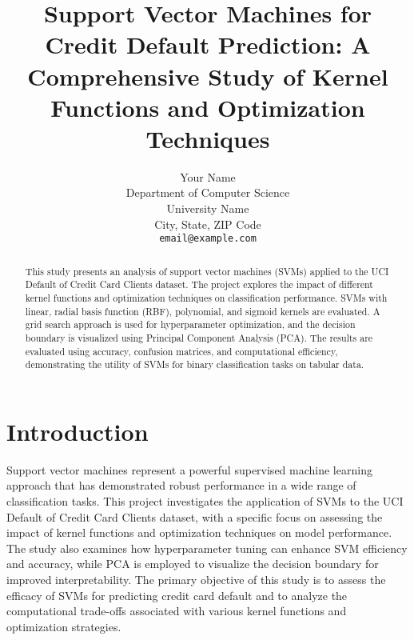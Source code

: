 \documentclass{article}  %
\begin{document}
\title{Support Vector Machines for Credit Default Prediction: A Comprehensive Study of Kernel Functions and Optimization Techniques}

\author{%
  Your Name \\
  Department of Computer Science\\
  University Name\\
  City, State, ZIP Code \\
  \texttt{email@example.com} \\
}

\maketitle
\begin{abstract}
This study presents an analysis of support vector machines (SVMs) applied to the UCI Default of Credit Card Clients dataset. The project explores the impact of different kernel functions and optimization techniques on classification performance. SVMs with linear, radial basis function (RBF), polynomial, and sigmoid kernels are evaluated. A grid search approach is used for hyperparameter optimization, and the decision boundary is visualized using Principal Component Analysis (PCA). The results are evaluated using accuracy, confusion matrices, and computational efficiency, demonstrating the utility of SVMs for binary classification tasks on tabular data.
\end{abstract}

\section{Introduction}
Support vector machines represent a powerful supervised machine learning approach that has demonstrated robust performance in a wide range of classification tasks. This project investigates the application of SVMs to the UCI Default of Credit Card Clients dataset, with a specific focus on assessing the impact of kernel functions and optimization techniques on model performance. The study also examines how hyperparameter tuning can enhance SVM efficiency and accuracy, while PCA is employed to visualize the decision boundary for improved interpretability. The primary objective of this study is to assess the efficacy of SVMs for predicting credit card default and to analyze the computational trade-offs associated with various kernel functions and optimization strategies.
\end{document}
